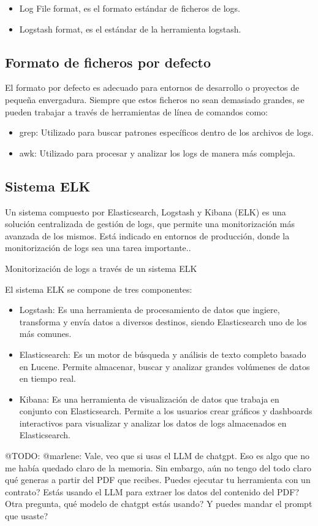 \begin{itemize}
    \item Log File format, es el formato estándar de ficheros de logs.
    \item Logstash format, es el estándar de la herramienta logstash.
\end{itemize}

\subsection*{Formato de ficheros por defecto}
El formato por defecto es adecuado para entornos de desarrollo o proyectos de pequeña envergadura. Siempre que estos
ficheros no sean demasiado grandes, se pueden trabajar a través de herramientas de línea de comandos como:

\begin{itemize}
    \item grep: Utilizado para buscar patrones específicos dentro de los archivos de logs.
    \item awk: Utilizado para procesar y analizar los logs de manera más compleja.
\end{itemize}

\subsection*{Sistema ELK}
Un sistema compuesto por Elasticsearch, Logstash y Kibana (ELK) es una solución centralizada de gestión de logs, que
permite una monitorización más avanzada de los mismos. Está indicado en entornos de producción, donde la monitorización
de logs sea una tarea importante..


Monitorización de logs a través de un sistema ELK

El sistema ELK se compone de tres componentes:

\begin{itemize}
    \item
    Logstash: Es una herramienta de procesamiento de datos que ingiere, transforma y envía datos a diversos destinos,
    siendo Elasticsearch uno de los más comunes.
    \item
    Elasticsearch: Es un motor de búsqueda y análisis de texto completo basado en Lucene. Permite almacenar, buscar y
    analizar grandes volúmenes de datos en tiempo real.
    \item Kibana: Es una herramienta de visualización de datos que trabaja en conjunto con Elasticsearch. Permite a los
    usuarios crear gráficos y dashboards interactivos para visualizar y analizar los datos de logs almacenados en
    Elasticsearch.
\end{itemize}



\colorbox{color_highlight}{@TODO: @marlene:}
Vale, veo que si usas el LLM de chatgpt. Eso es algo que no me había quedado claro de la memoria. Sin embargo, aún
no
tengo del todo claro qué generas a partir del PDF que recibes. Puedes ejecutar tu herramienta con un contrato? Estás
usando el LLM para extraer los datos del contenido del PDF? Otra pregunta, qué modelo de chatgpt estás usando? Y
puedes
mandar el prompt que usaste?
